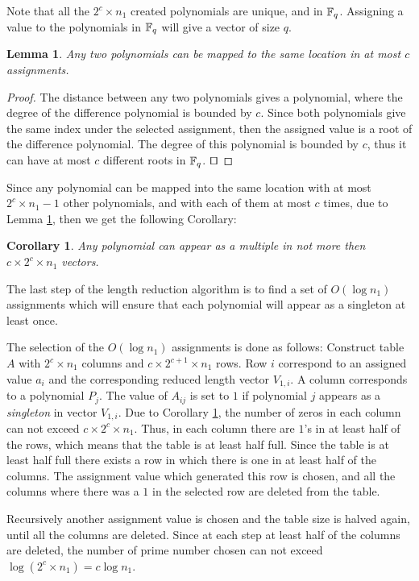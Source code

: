 \documentclass[11pt,amssymb]{article}
\newtheorem{lemma}[theorem]{Lemma}
\newtheorem{corollary}{Corollary}
\def\squareforqed{\hbox{\rlap{$\sqcap$}$\sqcup$}}
\newcommand{\qed}{\vrule height6pt width4pt\medskip}
\newcommand{\QED}{\hfill\qed}
\def\squareforqed{\hbox{\rlap{$\sqcap$}$\sqcup$}}
\def\qed{\ifmmode\squareforqed\else{\unskip\nobreak\hfil
\def\mod{\ {\rm mod}\ }
\penalty50\hskip1em\null\nobreak\hfil\squareforqed
\parfillskip=0pt\finalhyphendemerits=0\endgraf}\fi}
\newcommand{\F}{{\Bbb F}}
\begin{document}
Note that all the $2^c \times n_1$ created polynomials are unique, and
in $\F_q$. Assigning a value to the polynomials in $\F_q$ will give a
vector of size $q$.

\begin{lemma}\label{l:maxRoots}
Any two polynomials can be mapped to the same location in at most
$c$ assignments.
\end{lemma}
\begin{proof}
The distance between any two polynomials gives a polynomial, where the
degree of the difference polynomial is bounded by $c$. Since both
polynomials give the same index under the selected assignment, then the
assigned value is a root of the difference polynomial. The degree of
this polynomial is bounded by $c$, thus it can have at most $c$
different roots in $\F_q$. $\QED$
\end{proof}

Since any polynomial can be mapped into the same location with at most
$2^c \times n_1-1$ other polynomials, and with each of them at most $c$
times, due to Lemma \ref{l:maxRoots}, then we get the following
Corollary:
\begin{corollary}\label{c:maxPolMultiples}
Any polynomial can appear as a {\it multiple} in not more then $c
\times 2^c \times n_1$ vectors.
\end{corollary}

The last step of the length reduction algorithm is to find a set of
$O(\log n_1)$ assignments which will ensure that each polynomial will
appear as a singleton at least once.

The selection of the $O(\log n_1)$ assignments is done as follows:
Construct table $A$ with $2^c \times n_1$ columns and $c \times
2^{c+1} \times n_1$ rows. Row $i$ correspond to an assigned value
$a_i$ and the corresponding reduced length vector $V_{1,i}$. A
column corresponds to a polynomial $P_j$. The value of $A_{ij}$ is set
to $1$ if polynomial $j$ appears as a {\it singleton} in vector
$V_{1,i}$. Due to Corollary \ref{c:maxPolMultiples}, the number of
zeros in each column can not exceed $c \times 2^c \times n_1$. Thus,
in each column there are $1$'s in at least half of the rows, which
means that the table is at least half full. Since the table is at
least half full there exists a row in which there is one in at least
half of the columns. The assignment value which generated this row
is chosen, and all the columns where there was a $1$ in the selected
row are deleted from the table.

Recursively another assignment value is chosen and the table size is
halved again, until all the columns are deleted. Since at each step
at least half of the columns are deleted, the number of prime number
chosen can not exceed  $\log (2^c \times n_1) = c \log n_1$.
\end{document}
